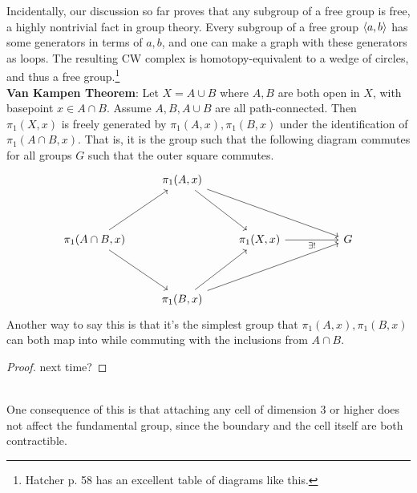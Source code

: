 \documentclass{amsart}
\begin{document}
	 Incidentally, our discussion so far proves that any subgroup of a free group is free, a highly nontrivial fact in group theory. Every subgroup of a free group $\langle a,b\rangle$ has some generators in terms of $a,b$, and one can make a graph with these generators as loops. The resulting CW complex is homotopy-equivalent to a wedge of circles, and thus a free group.\footnote{Hatcher p. 58 has an excellent table of diagrams like this.}\\
	 
	 \textbf{Van Kampen Theorem}: Let $X=A\cup B$ where $A,B$ are both open in $X$, with basepoint $x\in A\cap B$. Assume $A,B,A\cup B$ are all path-connected. Then $\pi_1(X,x)$ is freely generated by $\pi_1(A,x),\pi_1(B,x)$ under the identification of $\pi_1(A\cap B,x)$. That is, it is the group such that the following diagram commutes for all groups $G$ such that the outer square commutes.
	 $$
	 \begin{tikzcd}
	 	& {\pi_1(A,x)} \\
	 	\\
	 	{\pi_1(A\cap B,x)} && {\pi_1(X,x)} && G \\
	 	\\
	 	& {\pi_1(B,x)}
	 	\arrow[from=1-2, to=3-3]
	 	\arrow[from=1-2, to=3-5]
	 	\arrow[from=3-1, to=1-2]
	 	\arrow[from=3-1, to=5-2]
	 	\arrow["{\exists!}"', from=3-3, to=3-5]
	 	\arrow[from=5-2, to=3-3]
	 	\arrow[from=5-2, to=3-5]
	 \end{tikzcd}
	 $$
	 Another way to say this is that it's the simplest group that $\pi_1(A,x),\pi_1(B,x)$ can both map into while commuting with the inclusions from $A\cap B$.
	 \begin{proof}
	 	next time?
	 \end{proof}\\
	 
	 One consequence of this is that attaching any cell of dimension 3 or higher does not affect the fundamental group, since the boundary and the cell itself are both contractible.
	 
\end{document}
